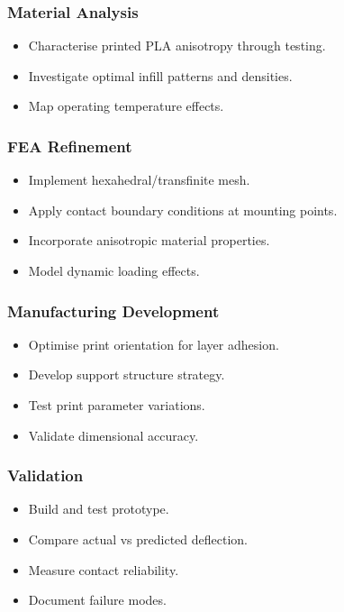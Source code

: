 \documentclass[10pt]{article}
\begin{document}
\subsubsection{Material Analysis}
\begin{itemize}[leftmargin=*]
	\item Characterise printed PLA anisotropy through testing.
	\item Investigate optimal infill patterns and densities.
	\item Map operating temperature effects.
\end{itemize}

\subsubsection{FEA Refinement}
\begin{itemize}[leftmargin=*]
	\item Implement hexahedral/transfinite mesh.
	\item Apply contact boundary conditions at mounting points.
	\item Incorporate anisotropic material properties.
	\item Model dynamic loading effects.
\end{itemize}

\subsubsection{Manufacturing Development}
\begin{itemize}[leftmargin=*]
	\item Optimise print orientation for layer adhesion.
	\item Develop support structure strategy.
	\item Test print parameter variations.
	\item Validate dimensional accuracy.
\end{itemize}

\subsubsection{Validation}
\begin{itemize}[leftmargin=*]
	\item Build and test prototype.
	\item Compare actual vs predicted deflection.
	\item Measure contact reliability.
	\item Document failure modes.
\end{itemize}
\end{document}
